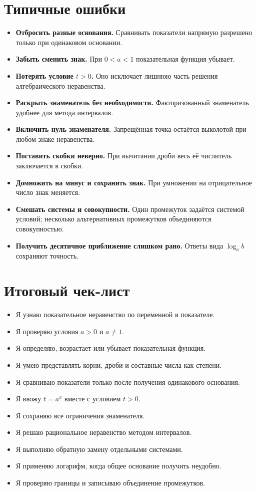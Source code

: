 \documentclass[a4paper,12pt]{article}
\newcommand{\key}[1]{\textcolor{accent}{\textbf{#1}}}
\begin{document}
\section{Типичные ошибки}

\begin{itemize}
  \item \key{Отбросить разные основания.} Сравнивать показатели напрямую разрешено только при одинаковом основании.
  \item \key{Забыть сменить знак.} При $0<a<1$ показательная функция убывает.
  \item \key{Потерять условие \(t>0\).} Оно исключает лишнюю часть решения алгебраического неравенства.
  \item \key{Раскрыть знаменатель без необходимости.} Факторизованный знаменатель удобнее для метода интервалов.
  \item \key{Включить нуль знаменателя.} Запрещённая точка остаётся выколотой при любом знаке неравенства.
  \item \key{Поставить скобки неверно.} При вычитании дроби весь её числитель заключается в скобки.
  \item \key{Домножить на минус и сохранить знак.} При умножении на от\-ри\-ца\-тель\-но\-е число знак меняется.
  \item \key{Смешать системы и совокупности.} Один промежуток задаётся системой условий; несколько альтернативных промежутков объединяются совокупностью.
  \item \key{Получить десятичное приближение слишком рано.} Ответы вида $\log_a b$ сохраняют точность.
\end{itemize}

\section{Итоговый чек-лист}

\begin{itemize}
  \item[$\square$] Я узнаю показательное неравенство по переменной в показателе.
  \item[$\square$] Я проверяю условия $a>0$ и $a\ne1$.
  \item[$\square$] Я определяю, возрастает или убывает показательная функция.
  \item[$\square$] Я умею представлять корни, дроби и составные числа как степени.
  \item[$\square$] Я сравниваю показатели только после получения одинакового основания.
  \item[$\square$] Я ввожу $t=a^x$ вместе с условием $t>0$.
  \item[$\square$] Я сохраняю все ограничения знаменателя.
  \item[$\square$] Я решаю рациональное неравенство методом интервалов.
  \item[$\square$] Я выполняю обратную замену отдельными системами.
  \item[$\square$] Я применяю логарифм, когда общее основание получить неудобно.
  \item[$\square$] Я проверяю границы и записываю объединение промежутков.
\end{itemize}
\end{document}
